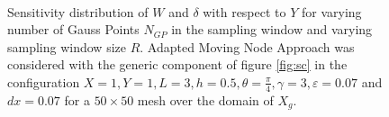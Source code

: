 \begin{figure}[ht]
\centering
{}%
     \\
    \caption{Sensitivity distribution of $W$ and $\delta$ with respect to $Y$ for varying number of Gauss Points $N_{GP}$ in the sampling window and varying sampling window size $R$. Adapted Moving Node Approach was considered with the generic component of figure \ref{fig:sc} in the configuration  $X=1,Y=1,L=3,h=0.5,\theta=\frac{\pi}{4}, \gamma=3, \varepsilon=0.07$ and  $dx=0.07$ for a $50\times50$ mesh over the domain of $X_g$.}%
    \label{fig:sensY}%
\end{figure}
